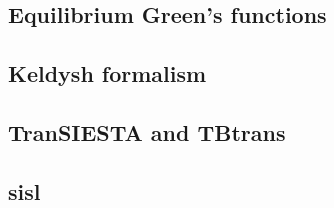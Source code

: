 \subsection{Equilibrium Green's functions}


\subsection{Keldysh formalism}
\subsection{TranSIESTA and TBtrans}
\subsection{sisl}


